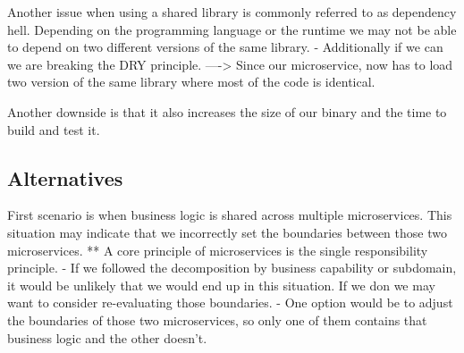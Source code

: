 \documentclass[a4paper, 11pt]{book}
\begin{document}
    Another issue when using a shared library is commonly referred to as dependency hell.
    Depending on the programming language or the runtime we may not be able to depend on two different versions of the same library.
    - Additionally if we can we are breaking the DRY principle.
    ----> Since our microservice, now has to load two version of the same library where most of the code is identical.

    Another downside is that it also increases the size of our binary and the time to build and test it.

    \subsection{Alternatives}
    First scenario is when business logic is shared across multiple microservices.
    This situation may indicate that we incorrectly set the boundaries between those two microservices.
    ** A core principle of microservices is the single responsibility principle.
    - If we followed the decomposition by business capability or subdomain, it would be unlikely that we would end up in this situation.
    If we don we may want to consider re-evaluating those boundaries.
    - One option would be to adjust the boundaries of those two microservices, so only one of them contains that business logic and the other doesn't.
\end{document}
